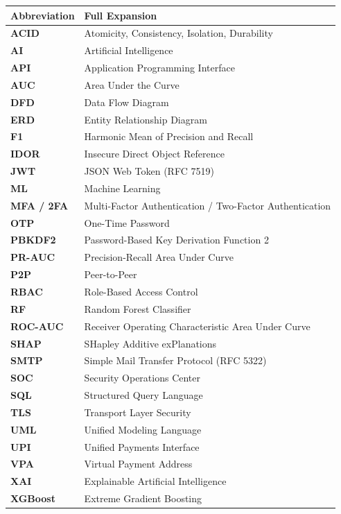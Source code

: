 \begin{table}[h]
\centering
\begin{tabularx}{\textwidth}{lX}
\toprule
\textbf{Abbreviation} & \textbf{Full Expansion} \\
\midrule
\textbf{ACID} & Atomicity, Consistency, Isolation, Durability \\
\textbf{AI} & Artificial Intelligence \\
\textbf{API} & Application Programming Interface \\
\textbf{AUC} & Area Under the Curve \\
\textbf{DFD} & Data Flow Diagram \\
\textbf{ERD} & Entity Relationship Diagram \\
\textbf{F1} & Harmonic Mean of Precision and Recall \\
\textbf{IDOR} & Insecure Direct Object Reference \\
\textbf{JWT} & JSON Web Token (RFC 7519) \\
\textbf{ML} & Machine Learning \\
\textbf{MFA / 2FA} & Multi-Factor Authentication / Two-Factor Authentication \\
\textbf{OTP} & One-Time Password \\
\textbf{PBKDF2} & Password-Based Key Derivation Function 2 \\
\textbf{PR-AUC} & Precision-Recall Area Under Curve \\
\textbf{P2P} & Peer-to-Peer \\
\textbf{RBAC} & Role-Based Access Control \\
\textbf{RF} & Random Forest Classifier \\
\textbf{ROC-AUC} & Receiver Operating Characteristic Area Under Curve \\
\textbf{SHAP} & SHapley Additive exPlanations \\
\textbf{SMTP} & Simple Mail Transfer Protocol (RFC 5322) \\
\textbf{SOC} & Security Operations Center \\
\textbf{SQL} & Structured Query Language \\
\textbf{TLS} & Transport Layer Security \\
\textbf{UML} & Unified Modeling Language \\
\textbf{UPI} & Unified Payments Interface \\
\textbf{VPA} & Virtual Payment Address \\
\textbf{XAI} & Explainable Artificial Intelligence \\
\textbf{XGBoost} & Extreme Gradient Boosting \\
\bottomrule
\end{tabularx}
\end{table}
